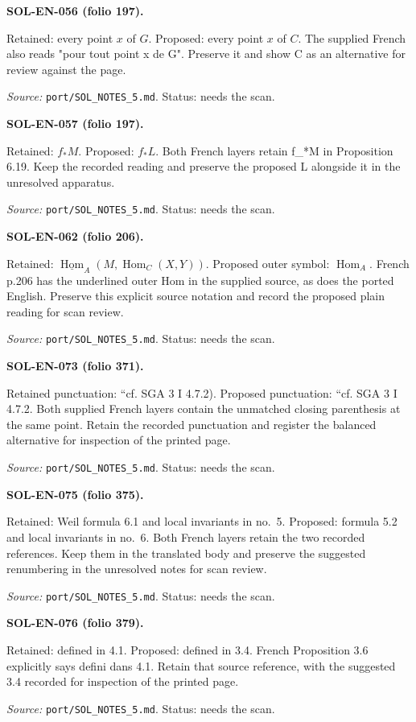 \medskip\noindent\textbf{SOL-EN-056 (folio 197).}\par
Retained: every point $x$ of $G$. Proposed: every point $x$ of $C$.
The supplied French also reads "pour tout point x de G". Preserve it and show C as an alternative for review against the page.
\par\noindent\textit{Source: }\texttt{port/SOL\_NOTES\_5.md}. Status: needs the scan.

\medskip\noindent\textbf{SOL-EN-057 (folio 197).}\par
Retained: $f_*M$. Proposed: $f_*L$.
Both French layers retain f\_*M in Proposition 6.19. Keep the recorded reading and preserve the proposed L alongside it in the unresolved apparatus.
\par\noindent\textit{Source: }\texttt{port/SOL\_NOTES\_5.md}. Status: needs the scan.

\medskip\noindent\textbf{SOL-EN-062 (folio 206).}\par
Retained: $\underline{\operatorname{Hom}}_A(M,\operatorname{Hom}_{C}(X,Y))$. Proposed outer symbol: $\operatorname{Hom}_A$.
French p.206 has the underlined outer Hom in the supplied source, as does the ported English. Preserve this explicit source notation and record the proposed plain reading for scan review.
\par\noindent\textit{Source: }\texttt{port/SOL\_NOTES\_5.md}. Status: needs the scan.

\medskip\noindent\textbf{SOL-EN-073 (folio 371).}\par
Retained punctuation: ``cf. SGA 3 I 4.7.2). Proposed punctuation: ``cf. SGA 3 I 4.7.2.
Both supplied French layers contain the unmatched closing parenthesis at the same point. Retain the recorded punctuation and register the balanced alternative for inspection of the printed page.
\par\noindent\textit{Source: }\texttt{port/SOL\_NOTES\_5.md}. Status: needs the scan.

\medskip\noindent\textbf{SOL-EN-075 (folio 375).}\par
Retained: Weil formula 6.1 and local invariants in no.~5. Proposed: formula 5.2 and local invariants in no.~6.
Both French layers retain the two recorded references. Keep them in the translated body and preserve the suggested renumbering in the unresolved notes for scan review.
\par\noindent\textit{Source: }\texttt{port/SOL\_NOTES\_5.md}. Status: needs the scan.

\medskip\noindent\textbf{SOL-EN-076 (folio 379).}\par
Retained: defined in 4.1. Proposed: defined in 3.4.
French Proposition 3.6 explicitly says defini dans 4.1. Retain that source reference, with the suggested 3.4 recorded for inspection of the printed page.
\par\noindent\textit{Source: }\texttt{port/SOL\_NOTES\_5.md}. Status: needs the scan.

